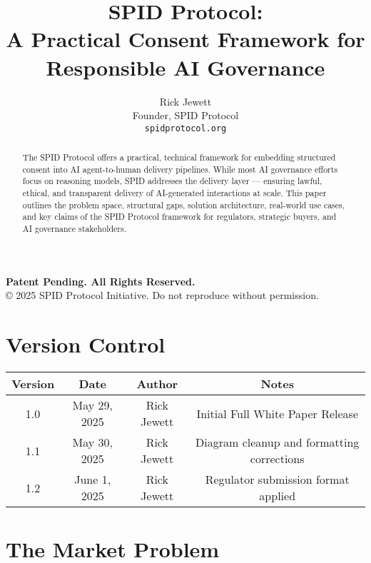 \documentclass[conference]{IEEEtran}
\title{SPID Protocol:\\A Practical Consent Framework for Responsible AI Governance}
\author{
Rick Jewett\\
Founder, SPID Protocol\\
\texttt{spidprotocol.org}
}
\date{}
\begin{document}
\maketitle

\begin{center}
\textbf{Patent Pending. All Rights Reserved.}\\
© 2025 SPID Protocol Initiative. Do not reproduce without permission.
\end{center}

\vspace{0.2in}

\section*{Version Control}
\begin{tabular}{|c|c|c|c|}
\hline
\textbf{Version} & \textbf{Date} & \textbf{Author} & \textbf{Notes} \\
\hline
1.0 & May 29, 2025 & Rick Jewett & Initial Full White Paper Release \\
\hline
1.1 & May 30, 2025 & Rick Jewett & Diagram cleanup and formatting corrections \\
\hline
1.2 & June 1, 2025 & Rick Jewett & Regulator submission format applied \\
\hline
\end{tabular}

\vspace{0.3in}

\begin{abstract}
The SPID Protocol offers a practical, technical framework for embedding structured consent into AI agent-to-human delivery pipelines. While most AI governance efforts focus on reasoning models, SPID addresses the delivery layer — ensuring lawful, ethical, and transparent delivery of AI-generated interactions at scale. This paper outlines the problem space, structural gaps, solution architecture, real-world use cases, and key claims of the SPID Protocol framework for regulators, strategic buyers, and AI governance stakeholders.
\end{abstract}

\onecolumn
\tableofcontents
\twocolumn


\section{The Market Problem}
\end{document}
